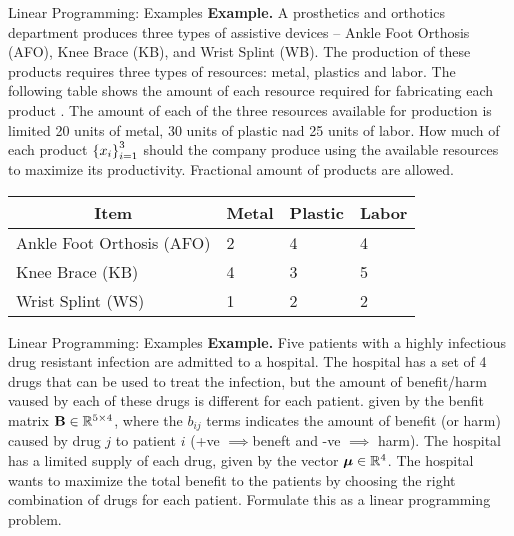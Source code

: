 \documentclass[aspectratio=169]{beamer}
\def\mf{\ensuremath\mathbf}
\def\mb{\ensuremath\mathbb}
\def\lc{\ensuremath\left\{}
\def\rc{\ensuremath\right\}}
\begin{document}
\begin{frame}[t]{Linear Programming: Examples}
  \textbf{Example.} A prosthetics and orthotics department produces three types of assistive devices -- Ankle Foot Orthosis (AFO), Knee Brace (KB), and Wrist Splint (WB). The production of these products requires three types of resources: metal, plastics and labor. The following table shows the amount of each resource required for fabricating each product . The amount of each of the three resources available for production is limited 20 units of metal, 30 units of plastic nad 25 units of labor. How much of each product $\lc x_i \rc_{i=1}^3$ should the company produce using the available resources to maximize its productivity. Fractional amount of products are allowed.
  \begin{table}[]
    \begin{tabular}{|l|l|l|l|}
    \hline
    \multicolumn{1}{|c|}{\textbf{Item}} & \multicolumn{1}{c|}{\textbf{Metal}} & \multicolumn{1}{c|}{\textbf{Plastic}} & \multicolumn{1}{c|}{\textbf{Labor}} \\ \hline
    Ankle Foot Orthosis (AFO) & 2 & 4 & 4 \\ \hline
    Knee Brace (KB) & 4 & 3 & 5 \\ \hline
    Wrist Splint (WS) & 1 & 2 & 2 \\ \hline
    \end{tabular}
    \end{table}
\end{frame}


\begin{frame}[t]{Linear Programming: Examples}
  \textbf{Example.} Five patients with a highly infectious drug resistant infection are admitted to a hospital. The hospital has a set of 4 drugs that can be used to treat the infection, but the amount of benefit/harm vaused by each of these drugs is different for each patient. given by the benfit matrix $\mf{B} \in \mb{R}^{5 \times 4}$, where the $b_{ij}$ terms indicates the amount of benefit (or harm) caused by drug $j$ to patient $i$ (+ve $\implies $beneft and -ve $\implies$ harm). The hospital has a limited supply of each drug, given by the vector $\bm{\mu} \in \mb{R}^4$. The hospital wants to maximize the total benefit to the patients by choosing the right combination of drugs for each patient. Formulate this as a linear programming problem.
\end{frame}
\end{document}

